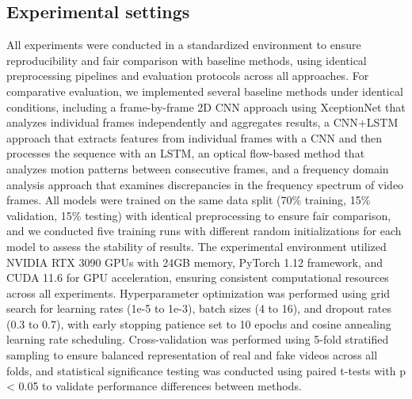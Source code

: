 \documentclass[conference]{IEEEtran}
\begin{document}
\subsection{Experimental settings}
All experiments were conducted in a standardized environment to ensure reproducibility and fair comparison with baseline methods, using identical preprocessing pipelines and evaluation protocols across all approaches.
For comparative evaluation, we implemented several baseline methods under identical conditions, including a frame-by-frame 2D CNN approach using XceptionNet that analyzes individual frames independently and aggregates results, a CNN+LSTM approach that extracts features from individual frames with a CNN and then processes the sequence with an LSTM, an optical flow-based method that analyzes motion patterns between consecutive frames, and a frequency domain analysis approach that examines discrepancies in the frequency spectrum of video frames.
All models were trained on the same data split (70\% training, 15\% validation, 15\% testing) with identical preprocessing to ensure fair comparison, and we conducted five training runs with different random initializations for each model to assess the stability of results.
The experimental environment utilized NVIDIA RTX 3090 GPUs with 24GB memory, PyTorch 1.12 framework, and CUDA 11.6 for GPU acceleration, ensuring consistent computational resources across all experiments.
Hyperparameter optimization was performed using grid search for learning rates (1e-5 to 1e-3), batch sizes (4 to 16), and dropout rates (0.3 to 0.7), with early stopping patience set to 10 epochs and cosine annealing learning rate scheduling.
Cross-validation was performed using 5-fold stratified sampling to ensure balanced representation of real and fake videos across all folds, and statistical significance testing was conducted using paired t-tests with p < 0.05 to validate performance differences between methods.
\end{document}
